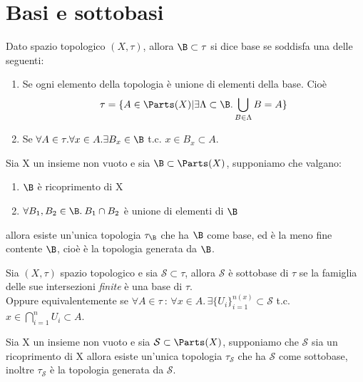 \documentclass[a4paper]{article}
\begin{document}
\section{Basi e sottobasi} 

\begin{deff}
Dato spazio topologico $(X,\tau )$, allora $\B \subset \tau $ si dice base se soddisfa una delle seguenti: 
\begin{enumerate}
\item Se ogni elemento della topologia è unione di elementi della base. Cioè 
	\begin{equation*}
	\tau = \{ A \in \Parts (X) | \exists \Lambda \subset \B . \bigcup _{B \in \Lambda } B = A \}
	\end{equation*}
\item Se $\forall A \in \tau . \forall x \in A . \exists B_x \in \B $ t.c. $ x \in B_x \subset A $.
\end{enumerate}
\end{deff}

\begin{prop}
Sia X un insieme non vuoto e sia $\B \subset \Parts (X) $, supponiamo che valgano:
	\begin{enumerate}
	\item $\B$ è ricoprimento di X
	\item $\forall B_1 , B_2 \in \B . \: B_1 \cap B_2 $ è unione di elementi di $ \B $ 
	\end{enumerate}
allora esiste un'unica topologia $\tau _{\B} $ che ha $ \B $ come base, ed è la meno fine contente $\B $, cioè è la topologia generata da $\B $.
\end{prop}

\begin{deff}
Sia $(X,\tau )$ spazio topologico e sia $\mathcal{S} \subset \tau $, allora $\mathcal{S}$ è sottobase di $\tau $ se la famiglia delle sue intersezioni \emph{finite} è una base di $ \tau $. \\
Oppure equivalentemente se $\forall A \in \tau \: : \, \forall x \in A. \, \exists \{U_i \}_{i=1} ^{n(x)} \subset \mathcal{S} $ t.c. $ x \in \bigcap_{i=1} ^n U_i \subset A $.
\end{deff}

\begin{prop}
Sia X un insieme non vuoto e sia $\mathcal{S} \subset \Parts (X) $, supponiamo che $\mathcal{S} $ sia un ricoprimento di X
allora esiste un'unica topologia $\tau _{\mathcal{S} } $ che ha $ \mathcal{S} $ come sottobase, inoltre $\tau _{\mathcal{S} } $ è la topologia generata da $\mathcal{S} $.
\end{prop}
\end{document}
